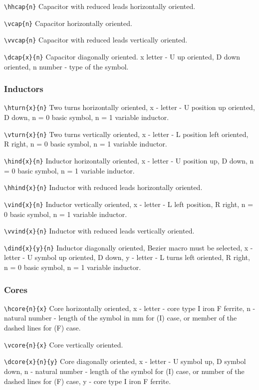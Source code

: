 \noindent
\verb?\hhcap{n}?
Capacitor with reduced leads horizontally oriented.

\noindent
\verb?\vcap{n}?
Capacitor horizontally oriented.

\noindent
\verb?\vvcap{n}?
Capacitor with reduced leads vertically oriented.

\noindent
\verb?\dcap{x}{n}?
Capacitor diagonally oriented. x letter -  U up
oriented, D down oriented, n number - type of the symbol.



\subsubsection{Inductors}
\verb?\hturn{x}{n}?
Two turns horizontally oriented, x - letter - U position up oriented,
D down, n = 0 basic symbol, n = 1 variable inductor.


\noindent
\verb?\vturn{x}{n}?
Two turns vertically oriented, x - letter - L position left oriented,
R right, n = 0 basic symbol, n = 1 variable inductor.


\noindent
\verb?\hind{x}{n}?
Inductor horizontally oriented, x - letter - U position up,
D down, n = 0 basic symbol, n = 1 variable inductor.

\noindent
\verb?\hhind{x}{n}?
Inductor with reduced leads horizontally oriented.

\noindent
\verb?\vind{x}{n}?
Inductor vertically oriented, x - letter - L left position,
R right, n = 0 basic symbol, n = 1 variable inductor.


\noindent
\verb?\vvind{x}{n}?
Inductor with reduced leads vertically oriented.


\noindent
\verb?\dind{x}{y}{n}?
Inductor diagonally oriented, Bezier macro must be selected,
x - letter - U symbol up oriented,
D down, y - letter - L turns left oriented, R right,
n = 0 basic symbol, n = 1 variable inductor.



\subsubsection{Cores}
\verb?\hcore{n}{x}?
Core horizontally oriented, x - letter - core type I iron F ferrite, n
- natural number - length of the symbol in mm for (I) case,
or member of the dashed lines for (F) case.

\noindent
\verb?\vcore{n}{x}?
Core vertically oriented.

\noindent
\verb?\dcore{x}{n}{y}?
Core diagonally oriented, x - letter - U symbol up,
D symbol down, n - natural number - length of the symbol for (I) case,
or number of the dashed lines for (F) case,
y - core type I iron F ferrite.



